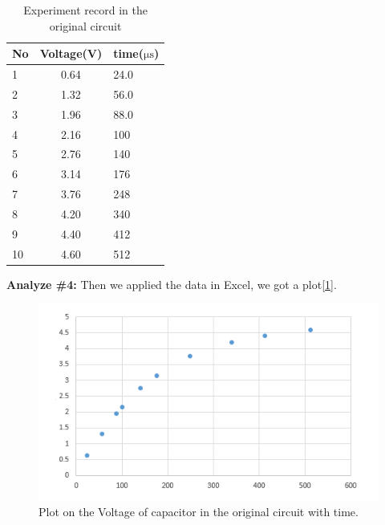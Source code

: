 \begin{table}[!htbp]\centering
	\caption{Experiment record in the original circuit}
	\renewcommand\arraystretch{1.5}
	\begin{tabular}{lcl}
		\toprule
		No		&Voltage(V)	&time($\mathrm{\mu s}$)	\\
		\midrule
		1		&0.64		&24.0		\\
		
		2		&1.32		&56.0		\\
		
		3		&1.96		&88.0		\\
		
		4		&2.16		&100		\\
		
		5		&2.76		&140		\\
		
		6		&3.14		&176		\\
		
		7		&3.76		&248		\\
		
		8		&4.20		&340		\\
		
		9		&4.40		&412		\\
		
		10		&4.60		&512		\\
		\bottomrule
	\end{tabular}
\end{table}
\hfill \newline
\textbf{Analyze \#4:} \newline
\phantom{ } Then we applied the data in Excel, we got a plot[\ref{fig:2.1}].\\
\begin{figure}[!htbp]
	\centering %
	\includegraphics[width=\linewidth]{images/2_1.PNG} %
	\caption{Plot on the Voltage of capacitor in the original circuit with time.} %
	\label{fig:2.1} %
\end{figure}
